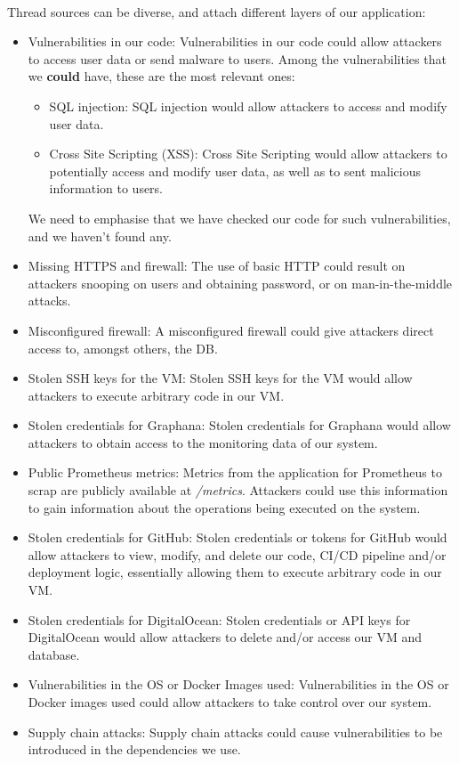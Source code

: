 \paragraph{} Thread sources can be diverse, and attach different layers of our application:
\begin{itemize}
	\item Vulnerabilities in our code: Vulnerabilities in our code could allow attackers to access user data or send malware to users. Among the vulnerabilities that we \textbf{could} have, these are the most relevant ones:
	      \begin{itemize}
		      \item SQL injection: SQL injection would allow attackers to access and modify user data.
		      \item Cross Site Scripting (XSS): Cross Site Scripting would allow attackers to potentially access and modify user data, as well as to sent malicious information to users.
	      \end{itemize}
	      We need to emphasise that we have checked our code for such vulnerabilities, and we haven't found any.
	\item Missing HTTPS and firewall: The use of basic HTTP could result on attackers snooping on users and obtaining password, or on man-in-the-middle attacks.
	\item Misconfigured firewall: A misconfigured firewall could give attackers direct access to, amongst others, the DB.
	\item Stolen SSH keys for the VM: Stolen SSH keys for the VM would allow attackers to execute arbitrary code in our VM.
	\item Stolen credentials for Graphana: Stolen credentials for Graphana would allow attackers to obtain access to the monitoring data of our system.
	\item Public Prometheus metrics: Metrics from the application for Prometheus to scrap are publicly available at \textit{/metrics}. Attackers could use this information to gain information about the operations being executed on the system.
	\item Stolen credentials for GitHub: Stolen credentials or tokens for GitHub would allow attackers to view, modify, and delete our code, CI/CD pipeline and/or deployment logic, essentially allowing them to execute arbitrary code in our VM.
	\item Stolen credentials for DigitalOcean: Stolen credentials or API keys for DigitalOcean would allow attackers to delete and/or access our VM and database.
	\item Vulnerabilities in the OS or Docker Images used: Vulnerabilities in the OS or Docker images used could allow attackers to take control over our system.
	\item Supply chain attacks: Supply chain attacks could cause vulnerabilities to be introduced in the dependencies we use.
\end{itemize}

